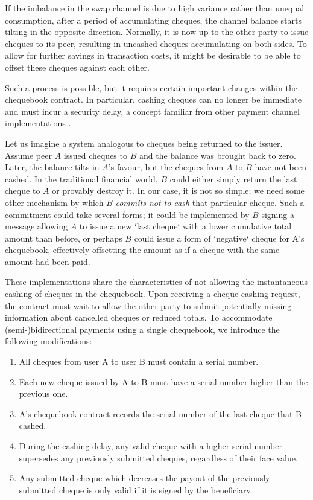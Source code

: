 If the imbalance in the swap channel is due to high variance rather than unequal consumption, after a period of accumulating cheques, the channel balance starts tilting in the opposite direction. Normally, it is now up to the other party to issue cheques to its peer, resulting in uncashed cheques accumulating on both sides.
To allow for further savings in transaction costs, it might be desirable to be able to offset these cheques against each other.

Such a process is possible, but it requires certain important changes within the chequebook contract. In particular, cashing cheques can no longer be immediate and must incur a security delay, a concept familiar from other payment channel implementations \cite{poon2015bitcoin, diferrante2017payment, mcdonald2017payment, tremback2015universal}. 

Let us imagine a system analogous to cheques being returned to the issuer. Assume peer $A$ issued cheques to $B$ and the balance was brought back to zero. Later, the balance tilts in $A$'s favour, but the cheques from $A$ to $B$ have not been cashed. In the traditional financial world, $B$ could either simply return the last cheque to $A$ or provably destroy it. In our case, it is not so simple; we need some other mechanism by which $B$ \emph{commits not to cash} that particular cheque. Such a commitment could take several forms; it could be implemented by $B$ signing a message allowing $A$ to issue a new `last cheque` with a lower cumulative total amount than before, or perhaps $B$ could issue a form of `negative` cheque for A's chequebook, effectively offsetting the amount as if a cheque with the same amount had been paid. 

These implementations share the characteristics of not allowing the instantaneous cashing of cheques in the chequebook. Upon receiving a cheque-cashing request, the contract must wait to allow the other party to submit potentially missing information about cancelled cheques or reduced totals. To accommodate (semi-)bidirectional payments using a single chequebook, we introduce the following modifications:

\begin{enumerate}[noitemsep]
    \item All cheques from user A to user B must contain a serial number.
    \item Each new cheque issued by A to B must have a serial number higher than the previous one.
    \item A's chequebook contract records the serial number of the last cheque that B cashed.
    \item During the cashing delay, any valid cheque with a higher serial number supersedes any previously submitted cheques, regardless of their face value.
    \item Any submitted cheque which decreases the payout of the previously submitted cheque is only valid if it is signed by the beneficiary.
\end{enumerate}


